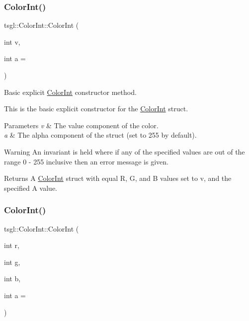 \subsubsection{\texorpdfstring{Color\+Int()}{ColorInt()}\hspace{0.1cm}{\footnotesize\ttfamily [2/3]}}
{\footnotesize\ttfamily tsgl\+::\+Color\+Int\+::\+Color\+Int (\begin{DoxyParamCaption}\item[{int}]{v,  }\item[{int}]{a = {} }\end{DoxyParamCaption})}



Basic explicit \hyperlink{structtsgl_1_1_color_int}{Color\+Int} constructor method. 

This is the basic explicit constructor for the \hyperlink{structtsgl_1_1_color_int}{Color\+Int} struct. 
\begin{DoxyParams}{Parameters}
{\em v} & The value component of the color. \\
\hline
{\em a} & The alpha component of the struct (set to 255 by default). \\
\hline
\end{DoxyParams}
\begin{DoxyWarning}{Warning}
An invariant is held where if any of the specified values are out of the range 0 -\/ 255 inclusive then an error message is given. 
\end{DoxyWarning}
\begin{DoxyReturn}{Returns}
A \hyperlink{structtsgl_1_1_color_int}{Color\+Int} struct with equal R, G, and B values set to {\ttfamily v}, and the specified A value. 
\end{DoxyReturn}
\mbox{\label{structtsgl_1_1_color_int_a0f0dea0c416a290eb4fdaf7583e27285}} 
\subsubsection{\texorpdfstring{Color\+Int()}{ColorInt()}\hspace{0.1cm}{\footnotesize\ttfamily [3/3]}}
{\footnotesize\ttfamily tsgl\+::\+Color\+Int\+::\+Color\+Int (\begin{DoxyParamCaption}\item[{int}]{r,  }\item[{int}]{g,  }\item[{int}]{b,  }\item[{int}]{a = {} }\end{DoxyParamCaption})}



